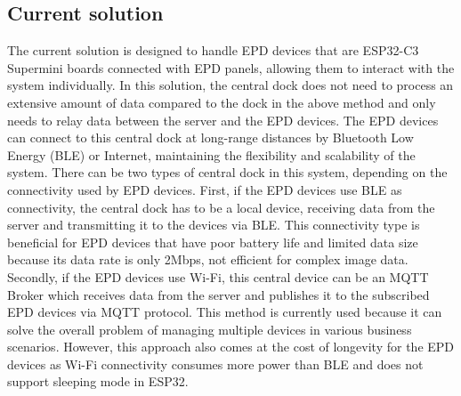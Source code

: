 \documentclass[../Main.tex]{subfiles}
\begin{document}
\subsection{Current solution}
The current solution is designed to handle \gls{EPD} devices that are ESP32-C3 Supermini boards connected with \gls{EPD} panels, allowing them to interact with the system individually. In this solution, the central dock does not need to process an extensive amount of data compared to the dock in the above method and only needs to relay data between the server and the \gls{EPD} devices. The \gls{EPD} devices can connect to this central dock at long-range distances by Bluetooth Low Energy (BLE) or Internet, maintaining the flexibility and scalability of the system. There can be two types of central dock in this system, depending on the connectivity used by \gls{EPD} devices. First, if the \gls{EPD} devices use BLE as connectivity, the central dock has to be a local device, receiving data from the server and transmitting it to the devices via BLE. This connectivity type is beneficial for \gls{EPD} devices that have poor battery life and limited data size because its data rate is only 2Mbps, not efficient for complex image data. Secondly, if the \gls{EPD} devices use Wi-Fi, this central device can be an MQTT Broker which receives data from the server and publishes it to the subscribed \gls{EPD} devices via MQTT protocol. This method is currently used because it can solve the overall problem of managing multiple devices in various business scenarios. However, this approach also comes at the cost of longevity for the \gls{EPD} devices as Wi-Fi connectivity consumes more power than BLE and does not support sleeping mode in ESP32.
\end{document}
